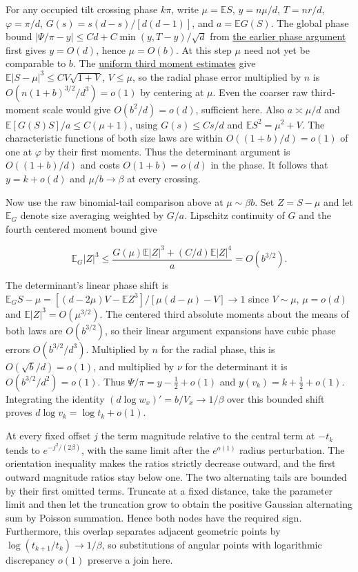 For any occupied tilt crossing phase $k\pi$, write $\mu=\mathbb ES$, $y=n\mu/d$, $T=nr/d$, $\varphi=\pi/d$, $G(s)=s(d-s)/[d(d-1)]$, and $a=\mathbb E G(S)$. The global phase bound $|\Psi/\pi-y|\le C d+C\min(y,T-y)/\sqrt d$ from \href{https://github.com/ProgramComputer/open-math-research/blob/4fb624ba937a8eecc1361a6066185cd81ab7b172/topics/balanced-arrays/quadratic/proof.md}{the earlier phase argument} first gives $y=O(d)$, hence $\mu=O(b)$. At this step $\mu$ need not yet be comparable to $b$. The \href{https://github.com/ProgramComputer/open-math-research/blob/78e9ef2c0c0b7a5daed126efbe12a46d030d8200/topics/balanced-arrays/dense-regime/rank-dependent/small-variance.md}{uniform third moment estimates} give $\mathbb E|S-\mu|^3\le C V\sqrt{1+V}$, $V\le\mu$, so the radial phase error multiplied by $n$ is $O(n(1+b)^{3/2}/d^3)=o(1)$ by centering at $\mu$. Even the coarser raw third-moment scale would give $O(b^2/d)=o(d)$, sufficient here. Also $a\asymp\mu/d$ and $\mathbb E[G(S)S]/a\le C(\mu+1)$, using $G(s)\le C s/d$ and $\mathbb E S^2=\mu^2+V$. The characteristic functions of both size laws are within $O((1+b)/d)=o(1)$ of one at $\varphi$ by their first moments. Thus the determinant argument is $O((1+b)/d)$ and costs $O(1+b)=o(d)$ in the phase. It follows that $y=k+o(d)$ and $\mu/b\to\beta$ at every crossing.

Now use the raw binomial-tail comparison above at $\mu\sim\beta b$. Set $Z=S-\mu$ and let $\mathbb E_G$ denote size averaging weighted by $G/a$. Lipschitz continuity of $G$ and the fourth centered moment bound give

\begin{equation*}
\mathbb E_G|Z|^3
\le \frac{G(\mu)\mathbb E|Z|^3+(C/d)\mathbb E|Z|^4}{a}
=O(b^{3/2}).
\end{equation*}

The determinant's linear phase shift is
$\mathbb E_G S-\mu=[(d-2\mu)V-\mathbb E Z^3]/[\mu(d-\mu)-V]\to1$
since $V\sim\mu$, $\mu=o(d)$ and $\mathbb E|Z|^3=O(\mu^{3/2})$. The centered third absolute moments about the means of both laws are $O(b^{3/2})$, so their linear argument expansions have cubic phase errors $O(b^{3/2}/d^3)$. Multiplied by $n$ for the radial phase, this is $O(\sqrt b/d)=o(1)$, and multiplied by $\nu$ for the determinant it is $O(b^{3/2}/d^2)=o(1)$. Thus $\Psi/\pi=y-\tfrac12+o(1)$ and $y(v_k)=k+\tfrac12+o(1)$. Integrating the identity $(d\log w_x)'=b/V_x\to1/\beta$ over this bounded shift proves $d\log v_k=\log t_k+o(1)$.

At every fixed offset $j$ the term magnitude relative to the central term at $-t_k$ tends to $e^{-j^2/(2\beta)}$, with the same limit after the $e^{o(1)}$ radius perturbation. The orientation inequality makes the ratios strictly decrease outward, and the first outward magnitude ratios stay below one. The two alternating tails are bounded by their first omitted terms. Truncate at a fixed distance, take the parameter limit and then let the truncation grow to obtain the positive Gaussian alternating sum by Poisson summation. Hence both nodes have the required sign. Furthermore, this overlap separates adjacent geometric points by $\log(t_{k+1}/t_k)\to1/\beta$, so substitutions of angular points with logarithmic discrepancy $o(1)$ preserve a join here.
